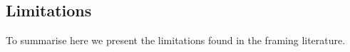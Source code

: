 






\subsection{Limitations}
\label{ssec:lit_framing_limit}

To summarise here we present the limitations found in the framing literature.

